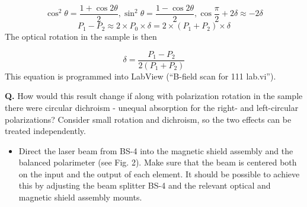 \documentclass{../lab}
\begin{document}
\begin{equation}
    \cos^2{\theta}=\frac{1+\cos{2\theta}}{2} ,  \sin^2{\theta}=\frac{1-\cos{2\theta}}{2} ,  \cos{\frac{\pi}{2}+2\delta}\approx -2\delta
\end{equation}
\begin{equation}
    P_1-P_2\approx 2\times P_0\times\delta=2\times(P_1+P_2)\times\delta
\end{equation}
The optical rotation in the sample is then

\begin{equation}
    \delta=\frac{P_1-P_2}{2(P_1+P_2)}
\end{equation}
This equation is programmed into LabView (``B-field scan for 111 lab.vi'').

\textbf{Q.} How would this result change if along with polarization rotation in the sample there were circular dichroism - unequal absorption for the right- and left-circular polarizations? Consider small rotation and dichroism, so the two effects can be treated independently.

\begin{itemize}
    \item Direct the laser beam from BS-4 into the magnetic shield assembly and the balanced polarimeter (see Fig. 2). Make sure that the beam is centered both on the input and the output of each element. It should be possible to achieve this by adjusting the beam splitter BS-4 and the relevant optical and magnetic shield assembly mounts.

\end{itemize}
\end{document}
